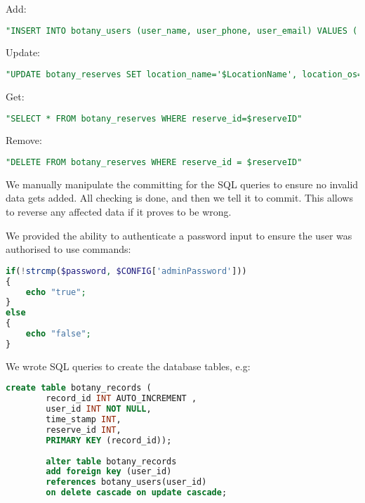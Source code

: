         Add:
        \begin{lstlisting}[language=sql]
"INSERT INTO botany_users (user_name, user_phone, user_email) VALUES ('$UserName', '$UserPhone', '$UserEmail')"
        \end{lstlisting}

        Update:
        \begin{lstlisting}[language=sql]
"UPDATE botany_reserves SET location_name='$LocationName', location_os='$LocationOS', description='$Description' WHERE reserve_id = $ReserveID"
        \end{lstlisting}
            
        Get:
        \begin{lstlisting}[language=sql]
            "SELECT * FROM botany_reserves WHERE reserve_id=$reserveID"
        \end{lstlisting}
        
        Remove:
        \begin{lstlisting}[language=sql]
            "DELETE FROM botany_reserves WHERE reserve_id = $reserveID"
        \end{lstlisting}

        We manually manipulate the committing for the SQL queries to ensure no invalid data gets added. All checking is done, and then we tell it to commit. This allows to reverse any affected data if it proves to be wrong.

        We provided the ability to authenticate a password input to ensure the user was authorised to use commands:
        \begin{lstlisting}[language=php]
if(!strcmp($password, $CONFIG['adminPassword']))    
{
    echo "true";
}
else
{
    echo "false";
}
        \end{lstlisting}
    
    We wrote SQL queries to create the database tables, e.g:
    \begin{lstlisting}[language=sql]
        create table botany_records ( 
        record_id INT AUTO_INCREMENT , 
        user_id INT NOT NULL, 
        time_stamp INT,
        reserve_id INT,
        PRIMARY KEY (record_id));
        
        alter table botany_records
        add foreign key (user_id)  
        references botany_users(user_id)  
        on delete cascade on update cascade;
    \end{lstlisting}

